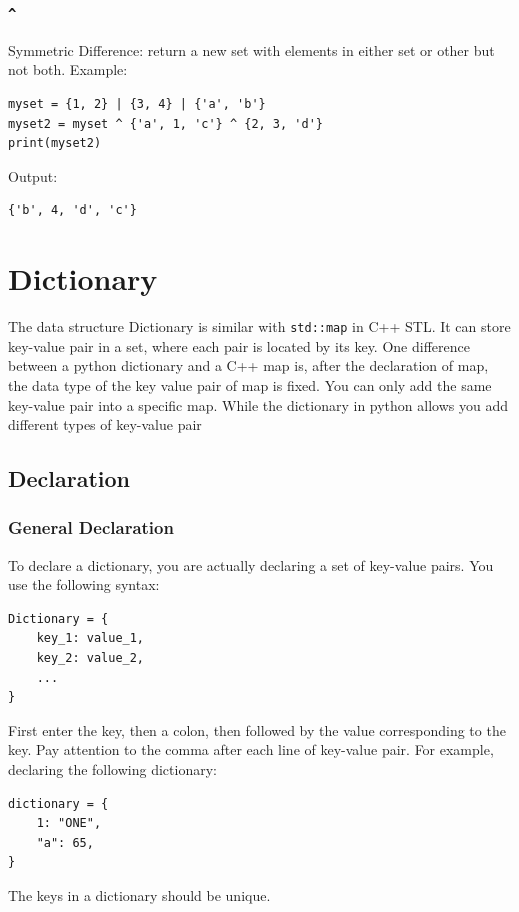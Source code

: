 \documentclass[12pt]{book}
\begin{document}
\subsubsection{\texttt{\textasciicircum{}}}
\label{sec:org07918f2}
Symmetric Difference: return a new set with elements in either set or other but not both. Example:
\begin{verbatim}
myset = {1, 2} | {3, 4} | {'a', 'b'}
myset2 = myset ^ {'a', 1, 'c'} ^ {2, 3, 'd'}
print(myset2)
\end{verbatim}
Output:
\begin{verbatim}
{'b', 4, 'd', 'c'}
\end{verbatim}

\section{Dictionary}
\label{sec:org5ebdbb0}
The data structure Dictionary is similar with \texttt{std::map} in C++ STL. It can store key-value pair in a set, where each pair is located by its key. One difference between a python dictionary and a C++ map is, after the declaration of map, the data type of the key value pair of map is fixed. You can only add the same key-value pair into a specific map. While the dictionary in python allows you add different types of key-value pair
\subsection{Declaration}
\label{sec:orgfd263e4}
\subsubsection{General Declaration}
\label{sec:orgc5da119}
To declare a dictionary, you are actually declaring a set of key-value pairs. You use the following syntax:
\begin{verbatim}
Dictionary = {
    key_1: value_1,
    key_2: value_2,
    ...
}
\end{verbatim}
First enter the key, then a colon, then followed by the value corresponding to the key. Pay attention to the comma after each line of key-value pair. For example, declaring the following dictionary:
\begin{verbatim}
dictionary = {
    1: "ONE",
    "a": 65,
}
\end{verbatim}
The keys in a dictionary should be unique.
\end{document}
